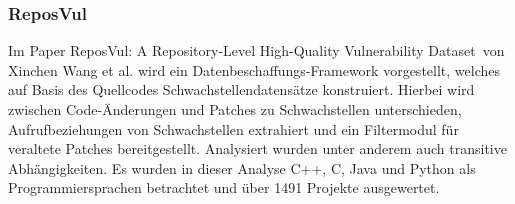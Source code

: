 \subsubsection{ReposVul} \label{sec:ReposVul}
    Im Paper \glqq ReposVul: A Repository-Level High-Quality Vulnerability Dataset\grqq~von Xinchen Wang et al. wird ein Datenbeschaffungs-Framework vorgestellt, welches auf Basis des Quellcodes Schwachstellendatensätze konstruiert. %
    Hierbei wird zwischen Code-Änderungen und Patches zu Schwachstellen unterschieden, Aufrufbeziehungen von Schwachstellen extrahiert und ein Filtermodul für veraltete Patches bereitgestellt.
    Analysiert wurden unter anderem auch transitive Abhängigkeiten.
    Es wurden in dieser Analyse C++, C, Java und Python als Programmiersprachen betrachtet und über 1491 Projekte ausgewertet.
